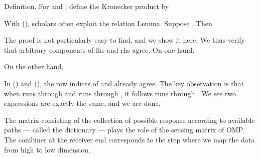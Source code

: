 \Result
{Definition.}
{
For  and , define the Kronecker product  by
}

With (), scholars often exploit the relation
\Result
{Lemma.}
{
Suppose ,
Then
}

The proof is not particularly easy to find, and we show it here.
We thus verify that arbitrary components of lhs and rhs agree.
On one hand,


On the other hand,


In () and (), the row indices of  and  already agree.
The key observation is that when  runs through  and  runs through , it follows  runs through .
We see two expressions are exactly the same, and we are done.

The matrix consisting of the collection of possible response according to available paths --- called the dictionary --- plays the role of the sensing matrix of OMP.
The combiner at the receiver end corresponds to the step where we map the data from high to low dimension.

